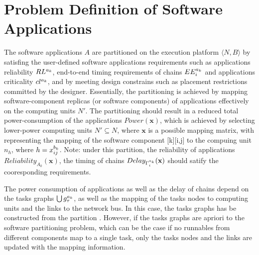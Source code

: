 \section{Problem Definition of Software Applications}\label{sec_problem}
The software applications $A$ are partitioned on the execution platform $\langle N,B\rangle$ by satisfing the user-defined software applications requirements such as applications reliability $\ssp{RL}$, end-to-end timing requirements of chains $\sss{EE}$ and applications criticality $\ssp{cl}$, and by meeting design constrains such as placement restrictions committed by the designer. Essentially, the partitioning is achieved by mapping software-component replicas (or software components) of applications effectively on the computing units $N'$. The partitioning should result in a reduced total power-consumption of the applications $Power(\textbf{x})$, which is achieved by selecting lower-power computing units $N'\subseteq N$, where $\textbf{x}$ is a possible mapping matrix, with \ttxkij representing the mapping of the software component [k][i,j] to the compuing unit $n_h$, where $h=x^{b_k}_{ij}$.  Note: under this partition, the reliability of applications $Reliability_{A_k}(\textbf{x})$, the timing of chains $Delay_{\sss{\Gamma}}(\textbf{x})$ should satify the cooresponding requirements. 

The power consumption of applications as well as the delay of chains depend on the tasks graphs $\bigcup\sss{g}[k][\tau]$, as well as the mapping of the tasks nodes to computing units and the links to the network bus. In this case, the tasks graphs has be constructed from the partition \ttx. However, if the tasks graphs are apriori to the software partitioning problem,  which can be the case if no runnables from different components map to a single task, only the tasks nodes and the links are updated with the mapping information.

